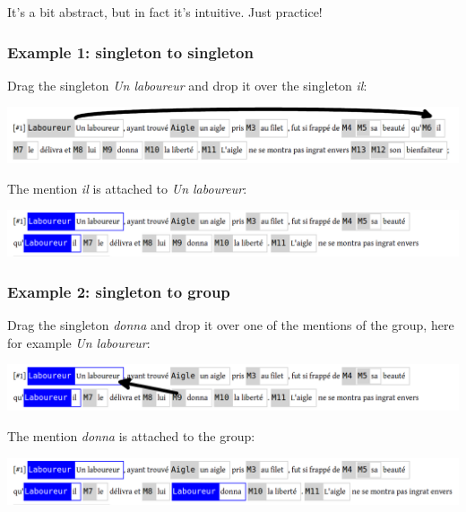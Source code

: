 \documentclass[12pt]{article}
\begin{document}
It's a bit abstract, but in fact it's intuitive.  Just practice!


 \subsubsection{Example 1: singleton to singleton}

Drag the singleton \emph{Un laboureur} and drop it over the singleton
\emph{il}:\nopagebreak

\includegraphics[width=17cm]{imgs/dd_example_01_before.png}

The mention \emph{il} is attached to \emph{Un laboureur}:\nopagebreak

\includegraphics[width=17cm]{imgs/dd_example_01_after.png}


 \subsubsection{Example 2: singleton to group}

Drag the singleton \emph{donna} and drop it over one of the mentions of the
group, here for example \emph{Un laboureur}:\nopagebreak

\includegraphics[width=17cm]{imgs/dd_example_02_before2.png}

The mention \emph{donna} is attached to the group:\nopagebreak

\includegraphics[width=17cm]{imgs/dd_example_02_after.png}
\end{document}
